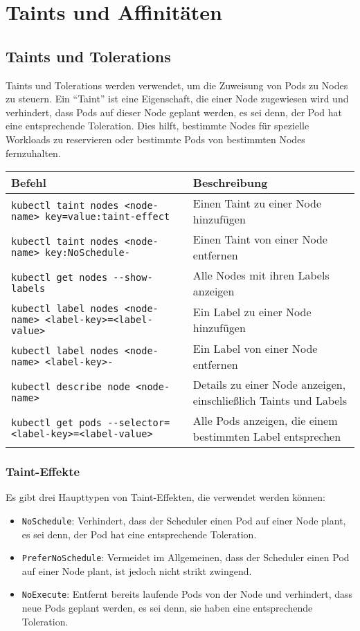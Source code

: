\chapter{Taints und Affinitäten}

\section{Taints und Tolerations}
Taints und Tolerations werden verwendet, um die Zuweisung von Pods zu Nodes zu steuern. Ein \enquote{Taint} ist eine Eigenschaft, die einer Node zugewiesen wird und verhindert, dass Pods auf dieser Node geplant werden, es sei denn, der Pod hat eine entsprechende Toleration. Dies hilft, bestimmte Nodes für spezielle Workloads zu reservieren oder bestimmte Pods von bestimmten Nodes fernzuhalten.\\

\noindent
\begin{tabular}{|p{}|p{}|}
\hline
\textbf{Befehl} & \textbf{Beschreibung} \\
\hline
\texttt{kubectl taint nodes <node-name> key=value:taint-effect} & Einen Taint zu einer Node hinzufügen \\
\texttt{kubectl taint nodes <node-name> key:NoSchedule-} & Einen Taint von einer Node entfernen \\
\texttt{kubectl get nodes {-}{-}show-labels} & Alle Nodes mit ihren Labels anzeigen \\
\texttt{kubectl label nodes <node-name> <label-key>=<label-value>} & Ein Label zu einer Node hinzufügen \\
\texttt{kubectl label nodes <node-name> <label-key>-} & Ein Label von einer Node entfernen \\
\texttt{kubectl describe node <node-name>} & Details zu einer Node anzeigen, einschließlich Taints und Labels \\
\texttt{kubectl get pods {-}{-}selector=<label-key>=<label-value>} & Alle Pods anzeigen, die einem bestimmten Label entsprechen \\
\hline
\end{tabular}

\subsection{Taint-Effekte}
Es gibt drei Haupttypen von Taint-Effekten, die verwendet werden können:
\begin{itemize}
    \item \texttt{NoSchedule}: Verhindert, dass der Scheduler einen Pod auf einer Node plant, es sei denn, der Pod hat eine entsprechende Toleration.
    \item \texttt{PreferNoSchedule}: Vermeidet im Allgemeinen, dass der Scheduler einen Pod auf einer Node plant, ist jedoch nicht strikt zwingend.
    \item \texttt{NoExecute}: Entfernt bereits laufende Pods von der Node und verhindert, dass neue Pods geplant werden, es sei denn, sie haben eine entsprechende Toleration.
\end{itemize}


